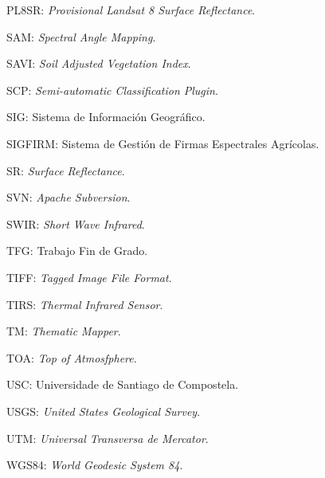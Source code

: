 PL8SR: \textit{Provisional Landsat 8 Surface Reflectance}.

SAM: \textit{Spectral Angle Mapping}.

SAVI: \textit{Soil Adjusted Vegetation Index}.

SCP: \textit{Semi-automatic Classification Plugin}.

SIG: Sistema de Información Geográfico.

SIGFIRM: Sistema de Gestión de Firmas Espectrales Agrícolas.

SR: \textit{Surface Reflectance}.

SVN: \textit{Apache Subversion}.

SWIR: \textit{Short Wave Infrared}.

TFG: Trabajo Fin de Grado.

TIFF: \textit{Tagged Image File Format}.

TIRS: \textit{Thermal Infrared Sensor}.

TM: \textit{Thematic Mapper}.

TOA: \textit{Top of Atmosfphere}.

USC: Universidade de Santiago de Compostela.

USGS: \textit{United States Geological Survey}.

UTM: \textit{Universal Transversa de Mercator}.

WGS84: \textit{World Geodesic System 84}.